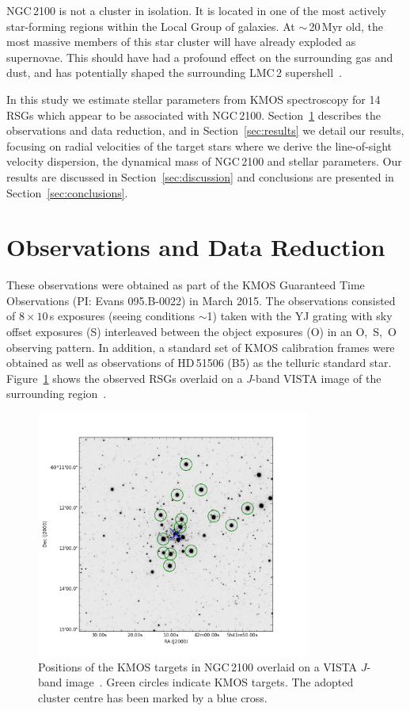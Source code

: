 \documentclass[useAMS,usenatbib]{mn2e}
\begin{document}
NGC\,2100 is not a cluster in isolation.
It is located in one of the most actively star-forming regions within the Local Group of galaxies.
At $\sim$\,20\,Myr old, the most massive members of this star cluster will have already exploded as supernovae.
This should have had a profound effect on the surrounding gas and dust, and has potentially shaped the surrounding LMC\,2 supershell~\citep[see][]{1999ApJ...518..298P}.


In this study we estimate stellar parameters from KMOS spectroscopy for 14 RSGs which appear to be associated with NGC\,2100.
Section~\ref{sec:observations} describes the observations and data reduction, and in Section~\ref{sec:results} we detail our results, focusing on radial velocities of the target stars where we derive the line-of-sight velocity dispersion,
the dynamical mass of NGC\,2100 and stellar parameters.
Our results are discussed in Section~\ref{sec:discussion} and conclusions are presented in Section~\ref{sec:conclusions}.



\section{Observations and Data Reduction} %
\label{sec:observations}
These observations were obtained as part of the KMOS Guaranteed Time Observations (PI: Evans 095.B-0022) in March 2015.
The observations consisted of $8\times10$\,s exposures (seeing conditions $\sim$1) taken with the YJ grating with sky offset exposures (S) interleaved between the object exposures (O) in an O,~S,~O observing pattern.
In addition, a standard set of KMOS calibration frames were obtained as well as observations of HD\,51506 (B5) as the telluric standard star.
Figure~\ref{fig:targets} shows the observed RSGs overlaid on a {\it J}-band VISTA image of the surrounding region~\citep{2011A&A...527A.116C}.

\begin{figure}
 \includegraphics[width=9.0cm]{NGC2100-targets}
 \caption{Positions of the KMOS targets in NGC\,2100 overlaid on a VISTA $J$-band image~\citep{2011A&A...527A.116C}.
          Green circles indicate KMOS targets.
          The adopted cluster centre has been marked by a blue cross.\label{fig:targets}
          }
\end{figure}
\end{document}

